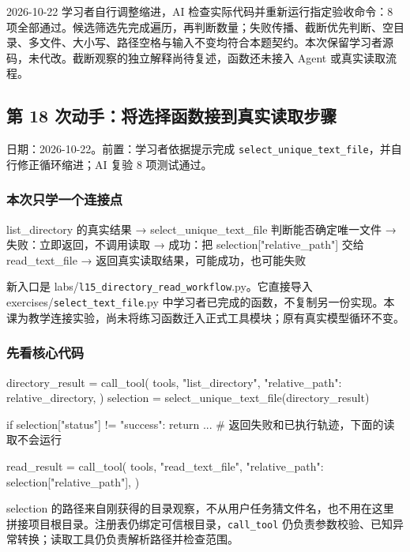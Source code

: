 2026-10-22 学习者自行调整缩进，AI 检查实际代码并重新运行指定验收命令：8 项全部通过。候选筛选先完成遍历，再判断数量；失败传播、截断优先判断、空目录、多文件、大小写、路径空格与输入不变均符合本题契约。本次保留学习者源码，未代改。截断观察的独立解释尚待复述，函数还未接入 Agent 或真实读取流程。

\subsection{第 18 次动手：将选择函数接到真实读取步骤}

日期：2026-10-22。前置：学习者依据提示完成 \nolinkurl{select_unique_text_file}，并自行修正循环缩进；AI 复验 8 项测试通过。

\subsubsection{本次只学一个连接点}

\begin{Code}
list_directory 的真实结果
  → select_unique_text_file 判断能否确定唯一文件
    → 失败：立即返回，不调用读取
    → 成功：把 selection["relative_path"] 交给 read_text_file
      → 返回真实读取结果，可能成功，也可能失败
\end{Code}

新入口是 labs/\nolinkurl{l15_directory_read_workflow}.py。它直接导入 exercises/\nolinkurl{select_text_file}.py 中学习者已完成的函数，不复制另一份实现。本课为教学连接实验，尚未将练习函数迁入正式工具模块；原有真实模型循环不变。

\subsubsection{先看核心代码}

\begin{Code}
directory_result = call_tool(
    tools, "list_directory", {"relative_path": relative_directory},
)
selection = select_unique_text_file(directory_result)

if selection["status"] != "success":
    return ...  # 返回失败和已执行轨迹，下面的读取不会运行

read_result = call_tool(
    tools, "read_text_file", {"relative_path": selection["relative_path"]},
)
\end{Code}

selection 的路径来自刚获得的目录观察，不从用户任务猜文件名，也不用在这里拼接项目根目录。注册表仍绑定可信根目录，\nolinkurl{call_tool} 仍负责参数校验、已知异常转换；读取工具仍负责解析路径并检查范围。

